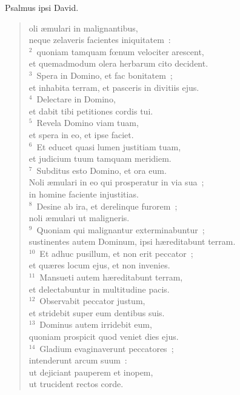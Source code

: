 \bchapter[Psalm]
Psalmus ipsi David. \begin{verse}oli \ae mulari in malignantibus,\\ neque zelaveris facientes iniquitatem~:\\
${}^{2}$~quoniam tamquam fœnum velociter arescent,\\ et quemadmodum olera herbarum cito decident.\\
${}^{3}$~Spera in Domino, et fac bonitatem~;\\ et inhabita terram, et pasceris in divitiis ejus.\\
${}^{4}$~Delectare in Domino,\\ et dabit tibi petitiones cordis tui.\\
${}^{5}$~Revela Domino viam tuam,\\ et spera in eo, et ipse faciet.\\
${}^{6}$~Et educet quasi lumen justitiam tuam,\\ et judicium tuum tamquam meridiem.\\
${}^{7}$~Subditus esto Domino, et ora eum.\\ Noli \ae mulari in eo qui prosperatur in via sua~;\\ in homine faciente injustitias.\\
${}^{8}$~Desine ab ira, et derelinque furorem~;\\ noli \ae mulari ut maligneris.\\
${}^{9}$~Quoniam qui malignantur exterminabuntur~;\\ sustinentes autem Dominum, ipsi h\ae reditabunt terram.\\
${}^{10}$~Et adhuc pusillum, et non erit peccator~;\\ et qu\ae res locum ejus, et non invenies.\\
${}^{11}$~Mansueti autem h\ae reditabunt terram,\\ et delectabuntur in multitudine pacis.\\
${}^{12}$~Observabit peccator justum,\\ et stridebit super eum dentibus suis.\\
${}^{13}$~Dominus autem irridebit eum,\\ quoniam prospicit quod veniet dies ejus.\\
${}^{14}$~Gladium evaginaverunt peccatores~;\\ intenderunt arcum suum~:\\ ut dejiciant pauperem et inopem,\\ ut trucident rectos corde.\\

\end{verse}
